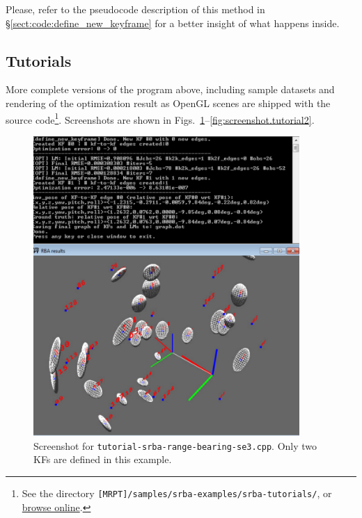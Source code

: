 \documentclass[a4paper,11pt]{article}
\begin{document}
Please, refer to the pseudocode description of this method 
in \S\ref{sect:code:define_new_keyframe} for a better insight of 
what happens inside.


\newpage

\subsection{Tutorials}

More complete versions of the program above, including sample datasets and rendering of the optimization result 
as OpenGL scenes are shipped with the source code\footnote{See the directory \texttt{[MRPT]/samples/srba-examples/srba-tutorials/}, 
or \href{http://mrpt.googlecode.com/svn/trunk/samples/srba-examples/srba-tutorials/}{browse online}.}.
Screenshots are shown in Figs.~\ref{fig:screenshot.tutorial1}--\ref{fig:screenshot.tutorial2}.

\begin{figure}[h]
\centering
\includegraphics[width=0.9\textwidth]{imgs/screenshot_tutorial_range-bearing-3D.pdf} 
\caption{Screenshot for \texttt{tutorial-srba-range-bearing-se3.cpp}. Only two KFs are defined in this example.}
\label{fig:screenshot.tutorial1}
\end{figure}

\newpage
\end{document}
